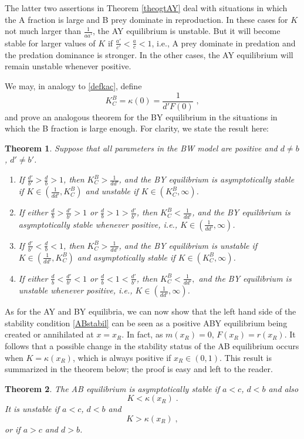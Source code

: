 \documentclass[12pt]{article}
\newtheorem{theorem}{Theorem}[section]
\theoremstyle{definition}
\begin{document}
The latter two assertions in Theorem \ref{theogtAY} deal with situations in which the A fraction is large and B prey dominate in reproduction. In these cases for $K$ not much larger than $\frac{1}{a a'}$, the AY equilibrium is unstable. But it will become stable for larger values of $K$ if $\frac{a'}{c'}<\frac{a}{c}<1$, i.e., A prey dominate in predation and the predation dominance is stronger. In the other cases, the AY equilibrium will remain unstable whenever positive.

We may, in analogy to \eqref{defkac}, define
\begin{equation}
	K^B_C= \kappa(0)= \frac{1}{d' F(0)}\;,
\end{equation}
and prove an analogous theorem for the BY equilibrium in the situations in which the B fraction is large enough. For clarity, we state the result here: 
\begin{theorem} \label{theogtBY}
	Suppose that all parameters in the BW model are positive and $d \neq b$, $d' \neq b'$. 
	\begin{enumerate}
		\item If $\frac{d'}{b'}>\frac{d}{b}>1$, then $K^B_C>\frac{1}{dd'}$, and the BY equilibrium is asymptotically stable if $K \in (\frac{1}{d d'}, K^B_C)$ and unstable if $K \in (K^B_C, \infty)$.
		\item If either $\frac{d}{b}>\frac{d'}{b'}>1$ or $\frac{d}{b}>1>\frac{d'}{b'}$, then $K^B_C<\frac{1}{dd'}$, and the BY equilibrium is asymptotically stable whenever positive, i.e., $K \in (\frac{1}{d d'}, \infty)$.
		\item If $\frac{d'}{b'}<\frac{d}{b}<1$, then $K^B_C>\frac{1}{dd'}$, and the BY equilibrium is unstable if $K \in (\frac{1}{d d'}, K^B_C)$ and asymptotically stable if $K \in (K^B_C, \infty)$.
		\item If either $\frac{d}{b}<\frac{d'}{b'}<1$ or $\frac{d}{b}<1<\frac{d'}{b'}$, then $K^B_C<\frac{1}{dd'},$ and the BY equilibrium is unstable whenever positive, i.e., $K \in (\frac{1}{d d'}, \infty)$.
	\end{enumerate}
\end{theorem}

As for the AY and BY equilibria, we can now show that the left hand side of the stability condition \eqref{ABstabil} can be seen as a positive ABY equilibrium being created or annihilated at $x=x_R$. In fact, as $m(x_R)=0$, $F(x_R)=r(x_R)$. It follows that a possible change in the stability status of the AB equilibrium occurs when $K=\kappa(x_R)$, which is always positive if $x_R \in (0,1)$. This result is summarized in the theorem below; the proof is easy and left to the reader.
\begin{theorem}  \label{theoABstab}
	The AB equilibrium is asymptotically stable if $a<c$, $d<b$ and also
	\begin{equation} \label{ABstabilkappa}
		K < \kappa(x_R)\;.
	\end{equation}
	It is unstable if $a<c$, $d<b$ and 
	\begin{equation} \label{ABunstabkappa}
		K >\kappa(x_R)\;,
	\end{equation}
	or if $a>c$ and $d>b$.
\end{theorem}
\end{document}
